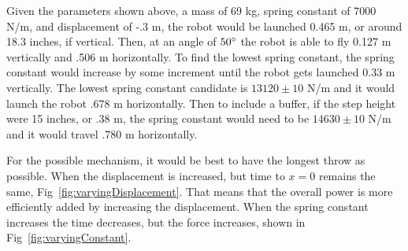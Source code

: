 \documentclass[12pt, letterpaper]{article}
\begin{document}
Given the parameters shown above, a mass of  69 kg, spring constant of 7000 N/m, and 
displacement of -.3 m, the robot would be launched 0.465 m, or around 18.3 inches, if vertical. Then, at an
angle of $50\degree$ the robot is able to fly 0.127 m vertically and .506 m horizontally. To find the lowest
spring constant, the spring constant would increase by some increment until the robot gets launched 0.33 m
vertically. The lowest spring constant candidate is $13120 \pm 10$ N/m and it would launch the robot .678 m
horizontally. Then to include a buffer, if the step height were 15 inches, or .38 m, the spring constant 
would need to be $14630 \pm 10$ N/m and it would travel .780 m horizontally.

For the possible mechanism, it would be best to have the longest throw as possible. When the displacement is
increased, but time to $x=0$ remains the same, Fig~\ref{fig:varyingDisplacement}. That means that the
overall power is more efficiently added by increasing the displacement. When the spring constant increases
the time decreases, but the force increases, shown in Fig~\ref{fig:varyingConstant}.
\end{document}
